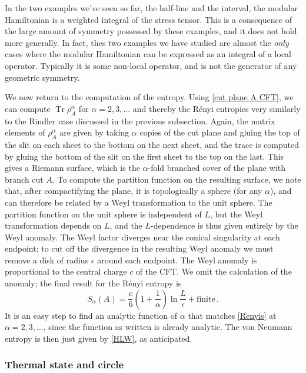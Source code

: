 \documentclass[11pt]{article}
\DeclareMathOperator{\Tr}{Tr}
\begin{document}
In the two examples we've seen so far, the half-line and the interval, the modular Hamiltonian is a weighted integral of the stress tensor. This is a consequence of the large amount of symmetry possessed by these examples, and it does not hold more generally. In fact, thes two examples we have studied are almost the \emph{only} cases where the modular Hamiltonian can be expressed as an integral of a local operator. Typically it is some non-local operator, and is not the generator of any geometric symmetry.

We now return to the computation of the entropy. Using \eqref{cut plane A CFT}, we can compute $\Tr\rho_A^\alpha$ for $\alpha=2,3,\ldots$ and thereby the R\'enyi entropies very similarly to the Rindler case discussed in the previous subsection. Again, the matrix elements of $\rho_A^\alpha$ are given by taking $\alpha$ copies of the cut plane and gluing the top of the slit on each sheet to the bottom on the next sheet, and the trace is computed by gluing the bottom of the slit on the first sheet to the top on the last. This gives a Riemann surface, which is the $\alpha$-fold branched cover of the plane with branch cut $A$. To compute the partition function on the resulting surface, we note that, after compactifying the plane, it is topologically a sphere (for any $\alpha$), and can therefore be related by a Weyl transformation to the unit sphere. The partition function on the unit sphere is independent of $L$, but the Weyl transformation depends on $L$, and the $L$-dependence is thus given entirely by the Weyl anomaly. The Weyl factor diverges near the conical singularity at each endpoint; to cut off the divergence in the resulting Weyl anomaly we must remove a disk of radius $\epsilon$ around each endpoint. The Weyl anomaly is proportional to the central charge $c$ of the CFT. We omit the calculation of the anomaly; the final result for the R\'enyi entropy is
\begin{equation}\label{Renyis}
S_\alpha(A) = \frac c6\left(1+\frac1\alpha\right)\ln\frac L\epsilon+\text{finite}\,.
\end{equation}
It is an easy step to find an analytic function of $\alpha$ that matches \eqref{Renyis} at $\alpha=2,3,\ldots$, since the function as written is already analytic. The von Neumann entropy is then just given by \eqref{HLW}, as anticipated.


\subsubsection{Thermal state and circle}
\label{sec:CFT thermal circle}
\end{document}
